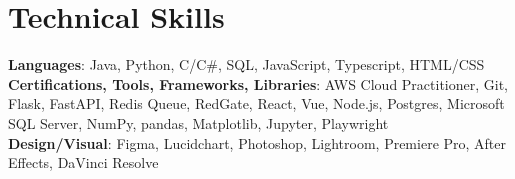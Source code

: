 \documentclass[letterpaper,11pt]{article}
\begin{document}
\section{Technical Skills}
 \begin{itemize}[leftmargin=0.15in, label={}]
    \small{\item{
     \textbf{Languages}{: Java, Python, C/C\#, SQL, JavaScript, Typescript, HTML/CSS} \\
     \textbf{Certifications, Tools, Frameworks, Libraries}{: AWS Cloud Practitioner, Git, Flask, FastAPI, Redis Queue, RedGate, React, Vue, Node.js, Postgres, Microsoft SQL Server, NumPy, pandas, Matplotlib, Jupyter, Playwright} \\
     \textbf{Design/Visual}{: Figma, Lucidchart, Photoshop, Lightroom, Premiere Pro, After Effects, DaVinci Resolve}
    }}
 \end{itemize}


  
\end{document}
